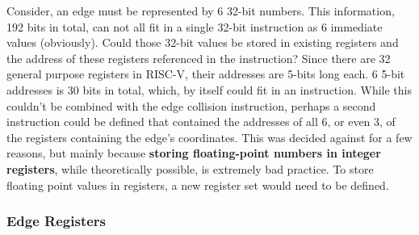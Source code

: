    Consider, an edge must be represented by 6 32-bit numbers. This information, 192 bits in total, can not all fit in a single 32-bit instruction as 6 immediate values (obviously). Could those 32-bit values be stored in existing registers and the address of these registers referenced in the instruction? Since there are 32 general purpose registers in RISC-V, their addresses are 5-bits long each. 6 5-bit addresses is 30 bits in total, which, by itself could fit in an instruction. While this couldn't be combined with the edge collision instruction, perhaps a second instruction could be defined that contained the addresses of all 6, or even 3, of the registers containing the edge's coordinates. This was decided against for a few reasons, but mainly because \textbf{storing floating-point numbers in integer registers}, while theoretically possible, is extremely bad practice. To store floating point values in registers, a new register set would need to be defined.

    \subsubsection{Edge Registers}
